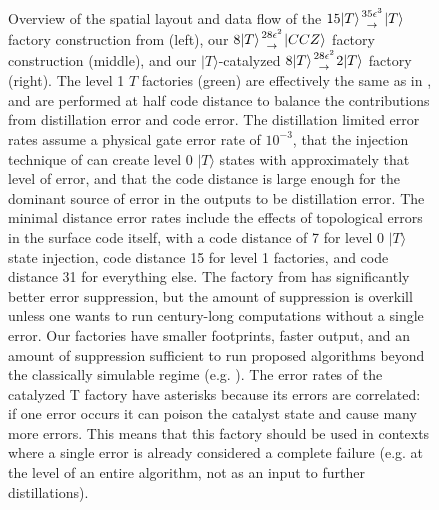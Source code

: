 \documentclass[superscriptaddress,notitlepage,longbibliography]{revtex4-1}
\newcommand{\factory}[3]{$#1 \genfrac{}{}{0pt}{}{#2}{\rightarrow} {#3}$ factory}
\begin{document}
\begin{figure}[ht]
  \label{fig:overview-dataflow}
  \caption{
    Overview of the spatial layout and data flow of the \factory{15|T\rangle}{35 \epsilon^3}{|T\rangle} construction from \cite{fowler2018} (left), our \factory{8|T\rangle}{28\epsilon^2}{|CCZ\rangle} construction (middle), and our $|T\rangle$-catalyzed \factory{8|T\rangle}{28\epsilon^2}{2|T\rangle} (right).
    The level 1 $T$ factories (green) are effectively the same as in \cite{fowler2018}, and are performed at half code distance to balance the contributions from distillation error and code error.
    The distillation limited error rates assume a physical gate error rate of $10^{-3}$, that the injection technique of \cite{li2015} can create level 0 $|T\rangle$ states with approximately that level of error, and that the code distance is large enough for the dominant source of error in the outputs to be distillation error.
    The minimal distance error rates include the effects of topological errors in the surface code itself, with a code distance of 7 for level 0 $|T\rangle$ state injection, code distance 15 for level 1 factories, and code distance 31 for everything else.
    The factory from \cite{fowler2018} has significantly better error suppression, but the amount of suppression is overkill unless one wants to run century-long computations without a single error.
    Our factories have smaller footprints, faster output, and an amount of suppression sufficient to run proposed algorithms beyond the classically simulable regime (e.g. \cite{babbush2018}).
    The error rates of the catalyzed T factory have asterisks because its errors are correlated: if one error occurs it can poison the catalyst state and cause many more errors.
    This means that this factory should be used in contexts where a single error is already considered a complete failure (e.g. at the level of an entire algorithm, not as an input to further distillations).
  }
\end{figure}
\end{document}

